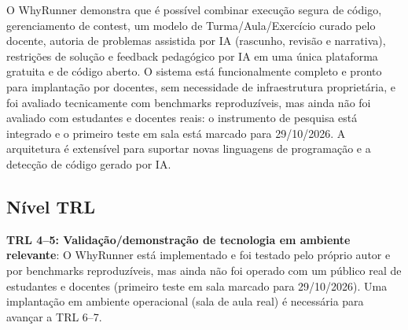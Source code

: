 \documentclass[12pt]{article}
\begin{document}
O WhyRunner demonstra que é possível combinar execução segura de código,
gerenciamento de contest, um modelo de Turma/Aula/Exercício curado pelo
docente, autoria de problemas assistida por IA (rascunho, revisão e
narrativa), restrições de solução e feedback pedagógico por IA em uma única
plataforma gratuita e de código aberto. O sistema está funcionalmente
completo e pronto para implantação por docentes, sem necessidade de
infraestrutura proprietária, e foi avaliado tecnicamente com benchmarks
reproduzíveis, mas ainda não foi avaliado com estudantes e docentes reais: o
instrumento de pesquisa está integrado e o primeiro teste em sala está marcado
para 29/10/2026. A arquitetura é extensível para suportar novas linguagens de
programação e a detecção de código gerado por IA.

\subsection*{Nível TRL}

\textbf{TRL 4--5: Validação/demonstração de tecnologia em ambiente relevante}:
O WhyRunner está implementado e foi testado pelo próprio autor e por benchmarks
reproduzíveis, mas ainda não foi operado com um público real de estudantes e
docentes (primeiro teste em sala marcado para 29/10/2026). Uma
implantação em ambiente operacional (sala de aula real) é necessária para
avançar a TRL 6--7.



\end{document}
